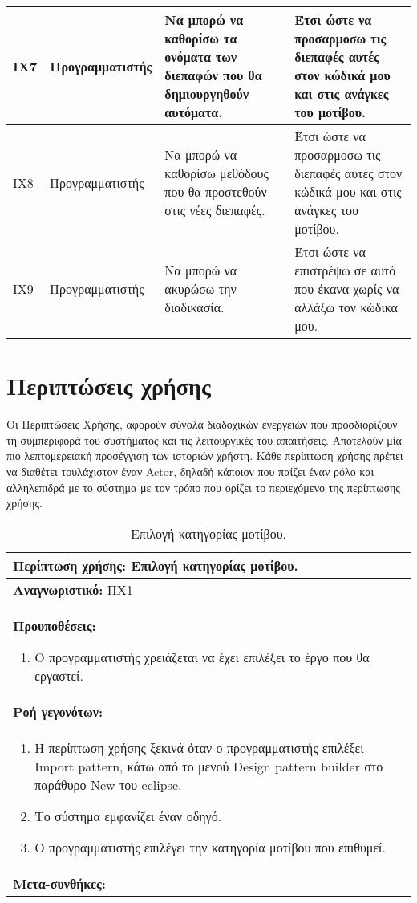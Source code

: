 \begin{table}[H]
\begin{tabular}{|p{1.5cm}|p{3.5cm}|p{4.5cm}|p{4.7cm}|}
        ΙΧ7 & Προγραμματιστής & Να μπορώ να καθορίσω τα ονόματα των διεπαφών που θα δημιουργηθούν αυτόματα. & Έτσι ώστε να προσαρμοσω τις διεπαφές αυτές στον κώδικά μου και στις ανάγκες του μοτίβου. \\ \hline
        ΙΧ8 & Προγραμματιστής & Να μπορώ να καθορίσω μεθόδους που θα προστεθούν στις νέες διεπαφές. & Έτσι ώστε να προσαρμοσω τις διεπαφές αυτές στον κώδικά μου και στις ανάγκες του μοτίβου. \\ \hline
        ΙΧ9 & Προγραμματιστής & Να μπορώ να ακυρώσω την διαδικασία. & Έτσι ώστε να επιστρέψω σε αυτό που έκανα χωρίς να αλλάξω τον κώδικα μου. \\ \hline
    \end{tabular}
\end{table}
\section{Περιπτώσεις χρήσης}
Οι Περιπτώσεις Χρήσης, αφορούν σύνολα διαδοχικών ενεργειών που προσδιορίζουν τη συμπεριφορά του συστήματος και τις λειτουργικές του απαιτήσεις. Αποτελούν μία πιο λεπτομερειακή προσέγγιση των ιστοριών χρήστη. Κάθε περίπτωση χρήσης πρέπει να διαθέτει τουλάχιστον έναν Actor, δηλαδή κάποιον που παίζει έναν ρόλο και αλληλεπιδρά με το σύστημα με τον τρόπο που ορίζει το περιεχόμενο της περίπτωσης χρήσης.
\begin{table}[H]
	\hspace*{-0.2cm}
    \centering
    \scriptsize
	\begin{tabular}{|p{10cm}|}
		\hline
		\textbf{Περίπτωση χρήσης:} Επιλογή κατηγορίας μοτίβου.\\
		\hline
		\textbf{Αναγνωριστικό:} ΠΧ1\\
		\hline	
		\textbf{Προυποθέσεις:}
		\begin{enumerate}
			\item Ο προγραμματιστής χρειάζεται να έχει επιλέξει το έργο που θα εργαστεί.
		\end{enumerate}\\
		\hline
		\textbf{Ροή γεγονότων:} \\ 
		\begin{enumerate}
			\item Η περίπτωση χρήσης ξεκινά όταν ο προγραμματιστής επιλέξει Import pattern, κάτω από το μενού Design pattern builder στο παράθυρο New του eclipse. 
			\item Το σύστημα εμφανίζει έναν οδηγό.
			\item Ο προγραμματιστής επιλέγει την κατηγορία μοτίβου που επιθυμεί.
		\end{enumerate}\\
		\hline
		\textbf{Μετα-συνθήκες:} \\
		\hline
    \end{tabular}
    \caption{Επιλογή κατηγορίας μοτίβου.}
    \label{tab:selectPatternCategoryUC}
\end{table}
